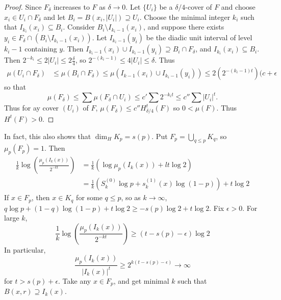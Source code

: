 \documentclass[11pt, a4paper]{memoir}
\theoremstyle{change}
\theoremstyle{plain}
\theoremstyle{nonumberplain}
\newtheorem{proof}{Proof}
\numberwithin{equation}{section}
\begin{document}
\begin{proof}
    Since $F_\delta$ increases to $F$ as $\delta\to 0$.
    Let $\{U_i\}$ be a $\delta/4$-cover of $F$ and choose $x_i\in U_i\cap F_\delta$ and let $B_i=B(x_i,|U_i|)\supseteq U_i$.
    Choose the minimal integer $k_i$ such that $I_{k_i}(x_i)\subseteq B_i$.
    Consider $B_i\setminus I_{k_i-1}(x_i)$, and suppose there exists $y_i\in F_\delta\cap(B_i\setminus I_{k_i-1}(x_i))$.
    Let $I_{k_i-1}(y_i)$ be the diadic unit interval of level $k_i-1$ containing $y$.
    Then $I_{k_i-1}(x_i)\cup I_{k_i-1}(y_i)\supseteq B_i\cap F_\delta$, and $I_{k_i}(x_i)\subseteq B_i$.
    Then $2^{-k_i}\leq 2|U_i|\leq 2\frac{\delta}{4}$, so $2^{-(k_i-1)}\leq 4|U_i|\leq\delta$.
    Thus
    \begin{align*}
        \mu(U_i\cap F_\delta) &\leq \mu(B_i\cap F_\delta)\leq\mu(I_{k-1}(x_i)\cup I_{k_i-1}(y_i))\leq 2(2^{-(k_i-1)t})(c+\epsilon
    \end{align*}
    so that
    \begin{equation*}
        \mu(F_\delta)\leq\sum \mu(F_\delta\cap U_i)\leq c'\sum 2^{-k_it}\leq c''\sum |U_i|^t.
    \end{equation*}
    Thus for ay cover $(U_i)$ of $F$, $\mu(F_\delta)\leq c''H^t_{\delta/4}(F)$ so $0<\mu(F)$.
    Thus $H^t(F)>0$.
\end{proof}
In fact, this also shows that $\dim_H K_p=s(p)$.
Put $F_p=\bigcup_{q\leq p}K_q$, so $\mu_p(F_p)=1$.
Then
\begin{align*}
    \frac{1}{k}\log\left(\frac{\mu_p(I_k(x))}{2^{-kt}}\right)&=\frac{1}{k}\left(\log\mu_p(I_k(x))+lt\log2\right)\\
                                                             &= \frac{1}{k}\left(S_k^{(0)}\log p+s_k^{(1)}(x)\log(1-p)\right)+t\log 2
\end{align*}
If $x\in F_{p}$, then $x\in K_q$ for some $q\leq p$, so as $k\to\infty$, $q\log p+(1-q)\log(1-p)+t\log 2\geq-s(p)\log 2+t\log 2$.
Fix $\epsilon>0$.
For large $k$,
\begin{equation*}
    \frac{1}{k}\log\left(\frac{\mu_p(I_k(x))}{2^{-kt}}\right)\geq(t-s(p)-\epsilon)\log 2
\end{equation*}
In particular,
\begin{equation*}
    \frac{\mu_p(I_k(x))}{|I_k(x)|^t}\geq 2^{k(t-s(p)-\epsilon)}\to\infty
\end{equation*}
for $t>s(p)+\epsilon$.
Take any $x\in F_p$, and get minimal $k$ such that $B(x,r)\supseteq I_k(x)$.
\end{document}
